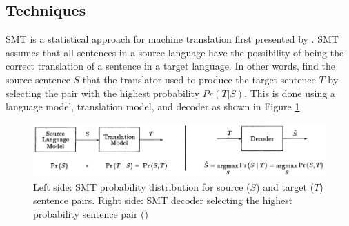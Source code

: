 \subsection{Techniques}




\acrfull{SMT} is a statistical approach for machine translation first presented by \cite{brown_statistical_1990}. 
\acrshort{SMT} assumes that all sentences in a source language have the possibility of being the correct translation of a sentence in a target language. 
In other words, find the source sentence $S$ that the translator used to produce the target sentence $T$ by selecting the pair with the highest probability $Pr ( T | S )$.
This is done using a language model, translation model, and decoder as shown in Figure \ref{fig:smt_diagram}.

\begin{figure}[ht!]
\centering
\includegraphics[width=1\textwidth]{media/literature/machine_translation/smt_3.png}
\caption[Diagram of \acrshort{SMT} probability distribution and decoder]{Left side: \acrshort{SMT} probability distribution for source ($S$) and target ($T$) sentence pairs. Right side: \acrshort{SMT} decoder selecting the highest probability sentence pair (\cite{brown_statistical_1990})}
\label{fig:smt_diagram}
\end{figure}



